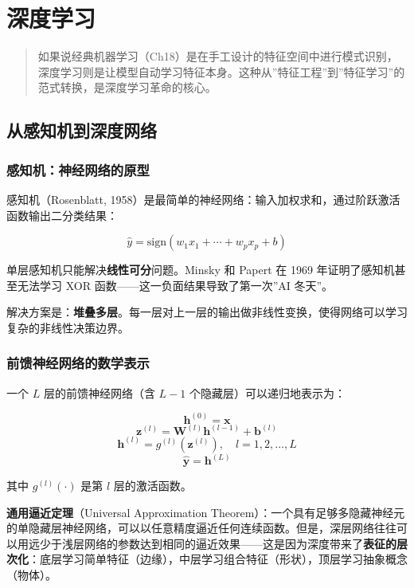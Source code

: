 \documentclass[
]{book}
\begin{document}
\chapter{深度学习}\label{ux6df1ux5ea6ux5b66ux4e60}

\begin{quote}
如果说经典机器学习（Ch18）是在手工设计的特征空间中进行模式识别，深度学习则是让模型自动学习特征本身。这种从''特征工程''到''特征学习''的范式转换，是深度学习革命的核心。
\end{quote}

\section{从感知机到深度网络}\label{ux4eceux611fux77e5ux673aux5230ux6df1ux5ea6ux7f51ux7edc}

\subsection{感知机：神经网络的原型}\label{ux611fux77e5ux673aux795eux7ecfux7f51ux7edcux7684ux539fux578b}

感知机（Rosenblatt, 1958）是最简单的神经网络：输入加权求和，通过阶跃激活函数输出二分类结果：

\[\hat{y} = \text{sign}(w_1 x_1 + \cdots + w_p x_p + b)\]

单层感知机只能解决\textbf{线性可分}问题。Minsky 和 Papert 在 1969 年证明了感知机甚至无法学习 XOR 函数------这一负面结果导致了第一次''AI 冬天''。

解决方案是：\textbf{堆叠多层}。每一层对上一层的输出做非线性变换，使得网络可以学习复杂的非线性决策边界。

\subsection{前馈神经网络的数学表示}\label{ux524dux9988ux795eux7ecfux7f51ux7edcux7684ux6570ux5b66ux8868ux793a}

一个 \(L\) 层的前馈神经网络（含 \(L-1\) 个隐藏层）可以递归地表示为：

\[\mathbf{h}^{(0)} = \mathbf{x}\]
\[\mathbf{z}^{(l)} = \mathbf{W}^{(l)} \mathbf{h}^{(l-1)} + \mathbf{b}^{(l)}\]
\[\mathbf{h}^{(l)} = g^{(l)}(\mathbf{z}^{(l)}), \quad l = 1, 2, \ldots, L\]
\[\hat{\mathbf{y}} = \mathbf{h}^{(L)}\]

其中 \(g^{(l)}(\cdot)\) 是第 \(l\) 层的激活函数。

\textbf{通用逼近定理}（Universal Approximation Theorem）：一个具有足够多隐藏神经元的单隐藏层神经网络，可以以任意精度逼近任何连续函数。但是，深层网络往往可以用远少于浅层网络的参数达到相同的逼近效果------这是因为深度带来了\textbf{表征的层次化}：底层学习简单特征（边缘），中层学习组合特征（形状），顶层学习抽象概念（物体）。
\end{document}
